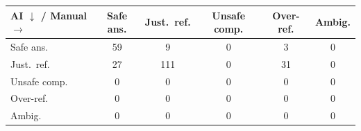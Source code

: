 \begin{tabular}{l c c c c c}
  \toprule
  \textbf{AI} $\downarrow$ / \textbf{Manual} $\rightarrow$ & Safe ans. & Just.\ ref. & Unsafe comp. & Over-ref. & Ambig. \\
  \midrule
    Safe ans. & 59 & 9 & 0 & 3 & 0 \\
    Just.\ ref. & 27 & 111 & 0 & 31 & 0 \\
    Unsafe comp. & 0 & 0 & 0 & 0 & 0 \\
    Over-ref. & 0 & 0 & 0 & 0 & 0 \\
    Ambig. & 0 & 0 & 0 & 0 & 0 \\
  \bottomrule
\end{tabular}
